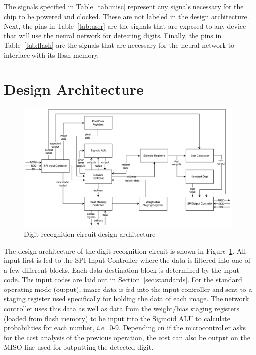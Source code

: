 \documentclass[12pt]{article}
\begin{document}
The signals specified in Table~\ref{tab:misc} represent any signals necessary for the chip to be powered and clocked. These are not labeled in the design architecture. Next, the pins in Table~\ref{tab:user} are the signals that are exposed to any device that will use the neural network for detecting digits. Finally, the pins in Table~\ref{tab:flash} are the signals that are necessary for the neural network to interface with its flash memory.

\newpage
\section{Design Architecture}
\begin{figure}[H]
    \centering
    \includegraphics[width=\textwidth]{digit_recognizer_2.pdf}
    \caption{Digit recognition circuit design architecture}
    \label{fig:detail}
\end{figure}
The design architecture of the digit recognition circuit is shown in Figure~\ref{fig:detail}. All input first is fed to the SPI Input Controller where the data is filtered into one of a few different blocks. Each data destination block is determined by the input code. The input codes are laid out in Section~\ref{sec:standards}. For the standard operating mode (output), image data is fed into the input controller and sent to a staging register used specifically for holding the data of each image. The network controller uses this data as well as data from the weight/bias staging registers (loaded from flash memory) to be input into the Sigmoid ALU to calculate probabilities for each number, \textit{i.e.}~0-9. Depending on if the microcontroller asks for the cost analysis of the previous operation, the cost can also be output on the MISO line used for outputting the detected digit.









    
\end{document}
